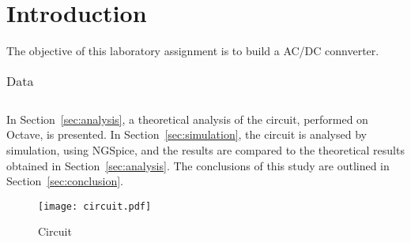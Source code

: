 \section{Introduction}
\label{sec:introduction}
The objective of this laboratory assignment is to build a AC/DC connverter. 




\begin{table}[H]
  \centering
  \begin{tabular}{|l|r|}
    \hline    
    
  \end{tabular}
  \caption{Data}
  \label{tab:data}
\end{table}



In Section~\ref{sec:analysis}, a theoretical analysis of the circuit, 
performed on Octave, is presented. In Section~\ref{sec:simulation}, the 
circuit is analysed by simulation, using NGSpice, and the results are compared to 
the theoretical results obtained in Section~\ref{sec:analysis}. The conclusions 
of this study are outlined in Section~\ref{sec:conclusion}.

\begin{figure}[H] \centering
\texttt{[image: circuit.pdf]}
\caption{Circuit }                                     %
\label{fig:circuit}
\end{figure}

